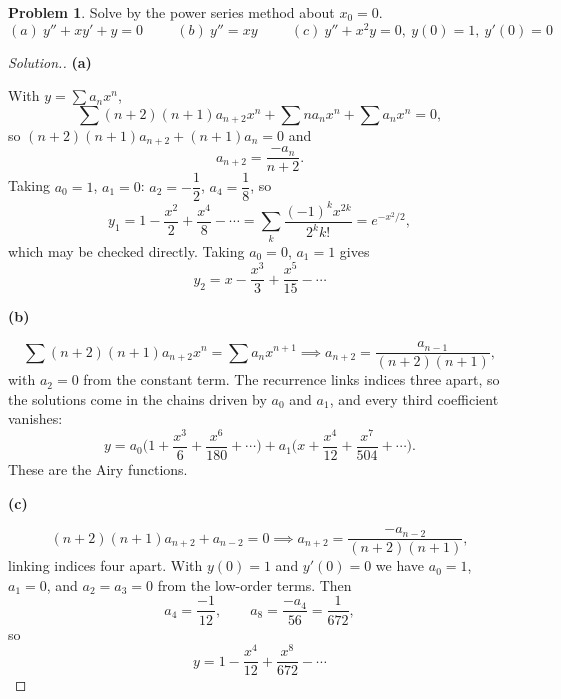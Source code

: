 \documentclass[11pt,a4paper]{article}
\theoremstyle{definition}
\newtheorem{problemx}{Problem}[subsection]
\newenvironment{problem}{\begin{problemx}}{\end{problemx}}
\newenvironment{solution}
  {\renewcommand{\qedsymbol}{}\begin{proof}[\textit{Solution}.]}
  {\end{proof}}
\newcommand{\subhead}[1]{%
  \par\medskip\noindent\textbf{#1}\par\nobreak\smallskip}
\begin{document}
\begin{problem}
Solve by the power series method about $x_0 = 0$.
$$(a)\ y''+xy'+y = 0\hspace{1cm}(b)\ y'' = xy\hspace{1cm}
(c)\ y''+x^2y = 0,\ y(0)=1,\ y'(0)=0$$
\end{problem}
\begin{solution}
\subhead{(a)}
With $y = \sum a_nx^n$,
$$\sum(n+2)(n+1)a_{n+2}x^n + \sum na_nx^n + \sum a_nx^n = 0 ,$$
so $(n+2)(n+1)a_{n+2} + (n+1)a_n = 0$ and
$$a_{n+2} = \frac{-a_n}{n+2}.$$
Taking $a_0 = 1$, $a_1 = 0$: $a_2 = -\dfrac12$, $a_4 = \dfrac18$, so
$$y_1 = 1 - \frac{x^2}{2} + \frac{x^4}{8} - \cdots
= \sum_{k}\frac{(-1)^kx^{2k}}{2^kk!} = e^{-x^2/2},$$
which may be checked directly. Taking $a_0=0$, $a_1=1$ gives
$$y_2 = x - \frac{x^3}{3} + \frac{x^5}{15} - \cdots$$

\subhead{(b)}
$$\sum(n+2)(n+1)a_{n+2}x^n = \sum a_nx^{n+1}
\implies a_{n+2} = \frac{a_{n-1}}{(n+2)(n+1)},$$
with $a_2 = 0$ from the constant term. The recurrence links indices three apart,
so the solutions come in the chains driven by $a_0$ and $a_1$, and every third
coefficient vanishes:
$$y = a_0\Big(1+\frac{x^3}{6}+\frac{x^6}{180}+\cdots\Big)
+ a_1\Big(x+\frac{x^4}{12}+\frac{x^7}{504}+\cdots\Big).$$
These are the Airy functions.

\subhead{(c)}
$$(n+2)(n+1)a_{n+2} + a_{n-2} = 0
\implies a_{n+2} = \frac{-a_{n-2}}{(n+2)(n+1)},$$
linking indices four apart. With $y(0)=1$ and $y'(0)=0$ we have $a_0=1$,
$a_1=0$, and $a_2 = a_3 = 0$ from the low-order terms. Then
$$a_4 = \frac{-1}{12},\qquad a_8 = \frac{-a_4}{56} = \frac{1}{672},$$
so
$$y = 1 - \frac{x^4}{12} + \frac{x^8}{672} - \cdots$$
\end{solution}
\end{document}
